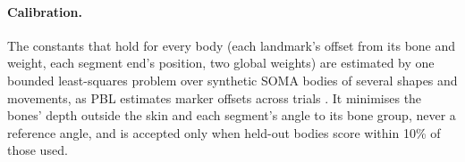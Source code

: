 \documentclass[11pt]{article}
\begin{document}
\paragraph{Calibration.} The constants that hold for every body (each landmark's offset from its bone and weight,
each segment end's position, two global weights) are estimated by one bounded least-squares problem over synthetic
SOMA bodies of several shapes and movements, as PBL estimates marker offsets across trials \cite{peiffer2025pbl}. It
minimises the bones' depth outside the skin and each segment's angle to its bone group, never a reference angle, and
is accepted only when held-out bodies score within 10\% of those used.
\end{document}

